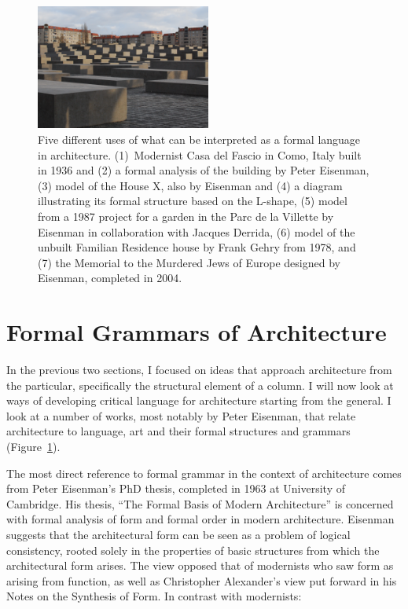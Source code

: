 \begin{figure}[t]
\includegraphics[height=11.1em]{fig/grammar-memorial.jpg}
\caption{Five different uses of what can be interpreted as a formal language in architecture.
(1)~Modernist Casa del Fascio in Como, Italy built in 1936 and (2) a formal analysis of the building
by Peter Eisenman, (3) model of the House X, also by Eisenman and (4) a diagram illustrating
its formal structure based on the L-shape, (5) model from a 1987 project for a garden in the
Parc de la Villette by Eisenman in collaboration with Jacques Derrida, (6) model of the unbuilt
Familian Residence house by Frank Gehry from 1978, and (7) the Memorial to the Murdered Jews of
Europe designed by Eisenman, completed in 2004.}
\label{fig:grammar}
\vspace{-0.5em}
\end{figure}

\section{Formal Grammars of Architecture}

In the previous two sections, I focused on ideas that approach architecture from
the particular, specifically the structural element of a column. I will now look at ways
of developing critical language for architecture starting from the general.
I look at a number of works, most notably by Peter Eisenman, that relate architecture to
language, art and their formal structures and grammars (Figure~\ref{fig:grammar}).

The most direct reference to formal grammar in the context of architecture comes
from Peter Eisenman's PhD thesis, completed in 1963 at University of Cambridge. His thesis,
``The Formal Basis of Modern Architecture'' is concerned with formal analysis of
form and formal order in modern architecture. Eisenman suggests that the architectural form
can be seen as a problem of logical consistency, rooted solely in the properties of basic
structures from which the architectural form arises. The view opposed that of modernists who saw
form as arising from function, as well as Christopher Alexander's view put forward in his
Notes on the Synthesis of Form. In contrast with modernists:


